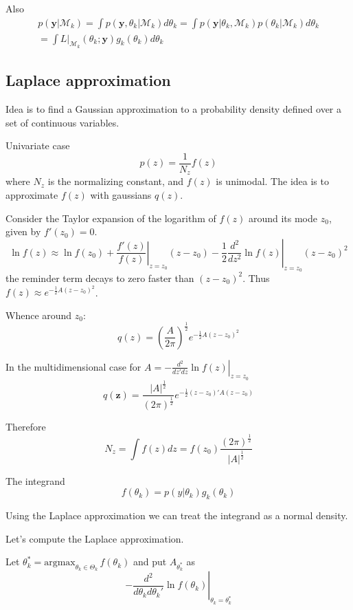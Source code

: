 \documentclass[a4paper]{article}
\newcommand{\brac}[1]{{\left ( #1 \right )}}
\newcommand{\induc}[1]{{\left . #1 \right \vert}}
\newcommand{\abs}[1]{{\left | #1 \right |}}
\newcommand{\Mcal}{\mathcal{M}}
\begin{document}
Also
\begin{multline*}
p\brac{\induc{\mathbf{y}}\Mcal_k}
= \int p\brac{\induc{\mathbf{y}, \theta_k}\Mcal_k} d\theta_k
= \int p\brac{\induc{\mathbf{y}}\theta_k, \Mcal_k} p\brac{\induc{\theta_k}\Mcal_k}d\theta_k\\
= \int \induc{L}_{\Mcal_k}(\theta_k;\mathbf{y}) g_k(\theta_k) d\theta_k
\end{multline*}

\subsection{Laplace approximation} %
\label{sub:laplace_approximation}

Idea is to find a Gaussian approximation to a probability density defined over a set of continuous variables.

Univariate case
\[p(z) = \frac{1}{N_z}f(z)\]
where $N_z$ is the normalizing constant, and $f(z)$ is unimodal.
The idea is to approximate $f(z)$ with gaussians $q(z)$.

Consider the Taylor expansion of the logarithm of $f(z)$ around its mode $z_0$, given by $f'(z_0) = 0$.
\[\ln f(z) \approx \ln f(z_0) + \induc{\frac{f'(z)}{f(z)}}_{z=z_0} (z-z_0) - \frac{1}{2} \induc{\frac{d^2}{dz^2} \ln f(z)}_{z=z_0} \brac{z-z_0}^2 \]
the reminder term decays to zero faster than $\brac{z-z_0}^2$. Thus $f(z)\approx e^{ -\frac{1}{2} A {(z-z_0)}^2 }$.

Whence around $z_0$:
\[q(z) = \brac{\frac{A}{2\pi}}^\frac{1}{2}e^{ -\frac{1}{2} A {(z-z_0)}^2 }\]

In the multidimensional case for $A = \induc{-\frac{d^2}{dz'dz}\ln f(z)}_{z=z_0}$
\[q(\mathbf{z}) = \frac{\abs{A}^\frac{1}{2}}{{(2\pi)}^\frac{1}{2}} e^{-\frac{1}{2} (z-z_0)'A(z-z_0)}\]

Therefore
\[N_z = \int f(z) dz = f(z_0) \frac{{(2\pi)}^\frac{1}{2}}{\abs{A}^\frac{1}{2}}\]


The integrand
\[f(\theta_k) = p\brac{\induc{y}\theta_k}g_k(\theta_k)\]

Using the Laplace approximation we can treat the integrand as a normal density.

Let's compute the Laplace approximation.

Let $\theta_k^* = \text{argmax}_{\theta_k\in \Theta_k}\,f(\theta_k)$ and put $A_{\theta_k^*}$ as
\[\induc{- \frac{d^2}{d\theta_kd\theta_k'} \ln f(\theta_k)}_{\theta_k=\theta_k^*}\]
\end{document}
